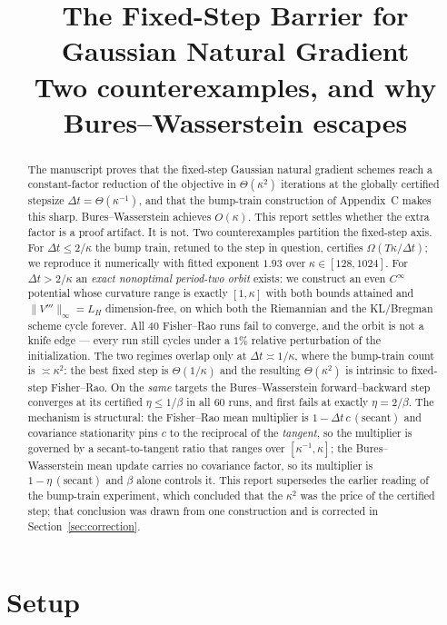 \documentclass[11pt]{article}
\title{The Fixed-Step Barrier for Gaussian Natural Gradient\\
\large Two counterexamples, and why Bures--Wasserstein escapes}
\author{}
\date{}
\begin{document}
\maketitle

\begin{abstract}
The manuscript proves that the fixed-step Gaussian natural gradient schemes reach a
constant-factor reduction of the objective in $\Theta(\kappa^2)$ iterations at the
globally certified stepsize $\Delta t=\Theta(\kappa^{-1})$, and that the bump-train
construction of Appendix~C makes this sharp. Bures--Wasserstein achieves
$O(\kappa)$. This report settles whether the extra factor is a proof artifact.
It is not. Two counterexamples partition the fixed-step axis. For
$\Delta t\le2/\kappa$ the bump train, retuned to the step in question, certifies
$\Omega(T\kappa/\Delta t)$; we reproduce it numerically with fitted exponent $1.93$
over $\kappa\in[128,1024]$. For $\Delta t>2/\kappa$ an \emph{exact nonoptimal
period-two orbit} exists: we construct an even $C^\infty$ potential whose curvature
range is exactly $[1,\kappa]$ with both bounds attained and
$\|V'''\|_\infty=L_H$ dimension-free, on which both the Riemannian and the
KL/Bregman scheme cycle forever. All $40$ Fisher--Rao runs fail to converge, and the
orbit is not a knife edge --- every run still cycles under a $1\%$ relative
perturbation of the initialization. The two regimes overlap only at
$\Delta t\asymp1/\kappa$, where the bump-train count is $\asymp\kappa^2$: the best
fixed step is $\Theta(1/\kappa)$ and the resulting $\Theta(\kappa^2)$ is intrinsic to
fixed-step Fisher--Rao. On the \emph{same} targets the Bures--Wasserstein
forward--backward step converges at its certified $\eta\le1/\beta$ in all $60$ runs,
and first fails at exactly $\eta=2/\beta$. The mechanism is structural: the
Fisher--Rao mean multiplier is $1-\Delta t\,c\,(\text{secant})$ and covariance
stationarity pins $c$ to the reciprocal of the \emph{tangent}, so the multiplier is
governed by a secant-to-tangent ratio that ranges over $[\kappa^{-1},\kappa]$;
the Bures--Wasserstein mean update carries no covariance factor, so its multiplier is
$1-\eta\,(\text{secant})$ and $\beta$ alone controls it. This report supersedes the
earlier reading of the bump-train experiment, which concluded that the $\kappa^2$ was
the price of the certified step; that conclusion was drawn from one construction and
is corrected in Section~\ref{sec:correction}.
\end{abstract}

\section{Setup}
\label{sec:setup}
\end{document}
